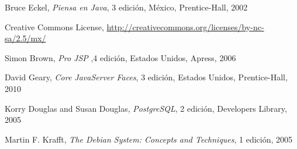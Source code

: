 \documentclass[11pt,letterpaper,titlepage]{article}
\begin{document}
\begin{thebibliography}{99}
 Bruce Eckel, \textit{Piensa en Java}, 3 edici\'on, M\'exico, Prentice-Hall, 2002


 Creative Commons License, \href{http://creativecommons.org/licenses/by-nc-sa/2.5/mx/}{http://creativecommons.org/licenses/by-nc-sa/2.5/mx/}


 Simon Brown, \textit{Pro JSP} ,4 edici\'on, Estados Unidos, Apress, 2006

 David Geary, \textit{Core JavaServer Faces}, 3 edici\'on, Estados Unidos, Prentice-Hall, 2010

 Korry Douglas and Susan Douglas, \textit{PostgreSQL}, 2 edici\'on, Developers Library, 2005


 Martin F. Krafft, \textit{The Debian System: Concepts and Techniques}, 1 edici\'on, 2005
                      


% 

\end{thebibliography}
\end{document}
